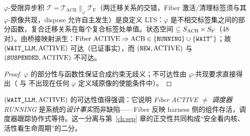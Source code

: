 \begin{proposition}[积的良好定义与派生不变式]\label{prop:product}
$\varphi$-受限异步积 $\mathcal{T}=\mathcal{T}_{\mathrm{ACB}}\parallel_\varphi\mathcal{T}_{\mathrm{F}}$（两迁移关系的交错，Fiber 激活/清理标签须与其 $\varphi$-原像共现，dispose 允许自主发生）是良定义 LTS：$\varphi$ 是不相交标签集之间的部分函数，复合迁移关系在每个复合标签处单值。状态空间 $\subseteq S_{\mathrm{ACB}}\times S_{\mathrm{F}}$（48 对）。由桥接映射派生：$\text{Fiber ACTIVE}\Rightarrow \text{ACB}\in\{\texttt{RUNNING}\}\cup\{\texttt{WAIT}^\tau\}$；故 $(\texttt{WAIT\_LLM},\text{ACTIVE})$ 可达（已证事实），而 $(\texttt{NEW},\text{ACTIVE})$ 与 $(\texttt{SUSPENDED},\text{ACTIVE})$ 不可达。
\end{proposition}
\begin{proof}
$\varphi$ 的部分性与函数性保证合成约束无歧义；不可达性由 $\varphi$-共现要求直接得出（ 与  不出现在任何 $\varphi$ 定义域原像的使能条件中）。
\end{proof}

$(\texttt{WAIT\_LLM},\text{ACTIVE})$ 的可达性值得强调：它说明 \emph{Fiber ACTIVE $\neq$ 调度器 RUNNING} 是系统的\emph{设计事实}而非缺陷——Fiber 反映 harness 侧的组件存活，调度器跟踪协作式等待。这一分离与第~\ref{ch:sep} 章的正交性共同构成“安全看内核、活性看生命周期”的二分。

